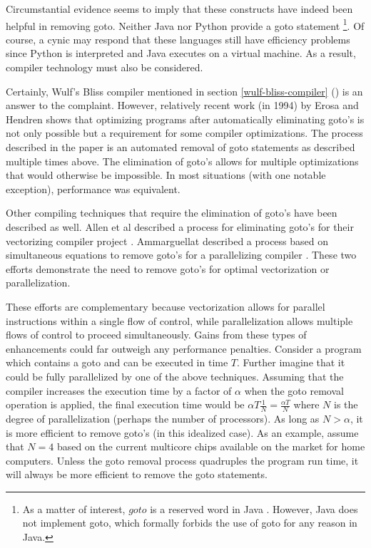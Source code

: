 \documentclass[letterpaper,10pt,twocolumn]{article}
\newcommand{\fullref}[1]{section \ref{#1} (\emph{\nameref{#1}})}
\begin{document}
Circumstantial evidence seems to imply that these constructs have indeed been
helpful in removing goto.  Neither Java nor Python provide a goto statement
\footnote{As a matter of interest, $goto$ is a reserved word in Java
\cite{java_keywords}.  However, Java does not implement goto,
which formally forbids the use of goto for any reason in Java.}.
Of course, a cynic may respond that these languages still have
efficiency problems since Python is interpreted and Java executes on a virtual
machine.  As a result, compiler technology must also be considered.

Certainly, Wulf's Bliss compiler mentioned in \fullref{wulf-bliss-compiler} is
an answer to the complaint.  However, relatively recent work (in 1994) by Erosa
and Hendren \cite{erosa} shows that optimizing programs after automatically
eliminating goto's is not only possible but a requirement for some compiler
optimizations.  The process described in the paper is an automated removal
of goto statements as described multiple times above.  The elimination of goto's
allows for multiple optimizations that would otherwise be impossible.  In most
situations (with one notable exception), performance was equivalent.

Other compiling techniques that require the elimination of goto's have been
described as well.  Allen et al described a process for eliminating
goto's for their vectorizing compiler project \cite{allen}.  Ammarguellat
described a process based on simultaneous equations to remove goto's for a
parallelizing compiler \cite{ammarguellat}.  These two efforts demonstrate
the need to remove goto's for optimal vectorization or parallelization.

These efforts are complementary because vectorization allows for parallel
instructions within a single flow of control, while parallelization allows
multiple flows of control to proceed simultaneously.  Gains from these types of
enhancements could far outweigh any performance penalties.  Consider a program
which contains a goto and can be executed in time $T$.  Further imagine that it
could be fully parallelized by one of the above techniques.  Assuming that
the compiler increases the execution time by a factor of $\alpha$ when the goto
removal operation is applied, the final execution time would be
$\alpha T \frac{1}{N} = \frac{\alpha T}{N}$ where $N$ is the degree of
parallelization (perhaps the number of processors).  As long as $N > \alpha$,
it is more efficient to remove goto's (in this idealized case).  As an example,
assume that $N = 4$ based on the current multicore chips available on the market
for home computers.  Unless the goto removal process quadruples the program run
time, it will always be more efficient to remove the goto statements.
\end{document}
